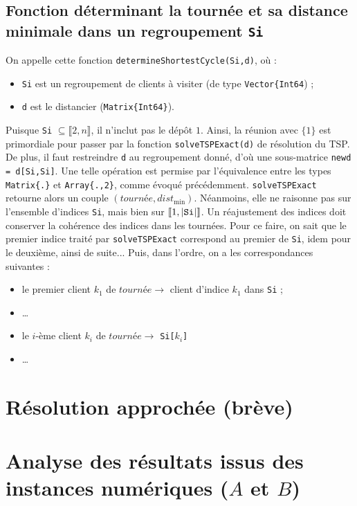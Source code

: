 \documentclass[french, 11pt, a4paper]{article} %
\newcommand{\smb}{\smallbreak}
\begin{document}
\subsection{Fonction déterminant la tournée et sa distance minimale dans un regroupement \texttt{Si}}
On appelle cette fonction \texttt{determineShortestCycle(Si,d)}, où : 
\begin{itemize}
    \item \verb+Si+ est un regroupement de clients à visiter (de type \verb+Vector{Int64+) ;
    \item \verb+d+ est le distancier (\verb+Matrix{Int64}+).
\end{itemize}
\smb Puisque \verb+Si+ $\subseteq \llbracket 2,n \rrbracket$, il n'inclut pas le dépôt $1$. Ainsi, la réunion avec $\{1\}$
est primordiale pour passer par la fonction \verb+solveTSPExact(d)+ de résolution du TSP.
\smb De plus, il faut restreindre \verb+d+ au regroupement donné, d'où une sous-matrice
\verb+newd = d[Si,Si]+. Une telle opération est permise par l'équivalence entre les types
\verb+Matrix{.}+ et \verb+Array{.,2}+, comme évoqué précédemment.
\smb \verb+solveTSPExact+ retourne alors un couple $(tourn\text{é}e,dist_{\text{min}})$. Néanmoins, elle ne raisonne pas sur l'ensemble d'indices \verb+Si+, mais bien sur
$\llbracket 1,|\text{\texttt{Si}}| \rrbracket$. 
\smb Un réajustement des indices doit conserver la cohérence
des indices dans les tournées. Pour ce faire, on sait que le premier indice traité par \verb+solveTSPExact+ correspond au premier de \verb+Si+,
idem pour le deuxième, ainsi de suite... Puis, dans l'ordre, on a les correspondances suivantes :
\begin{itemize}
    \item le premier client $k_1$ de $tourn\text{é}e \longrightarrow$ client d'indice $k_1$ dans \verb+Si+ ;
    \item \dots
    \item le $i$-ème client $k_i$ de $tourn\text{é}e \longrightarrow$ \verb+Si[+$k_i$\verb+]+
    \item \dots
\end{itemize}


\section{Résolution approchée (brève)}

\section{Analyse des résultats issus des instances numériques ($A$ et $B$)}
\end{document}
